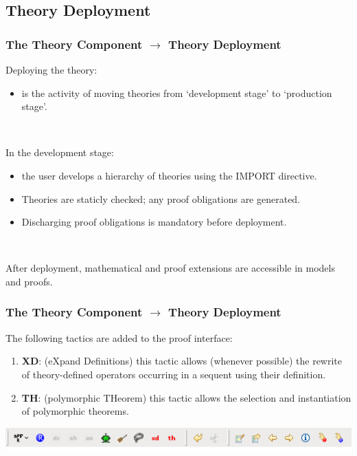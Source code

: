\documentclass{beamer}
\begin{document}
\subsection{Theory Deployment}
	\begin{frame}
		\frametitle{The Theory Component $\rightarrow$ Theory Deployment}
		Deploying the theory:
		\begin{itemize}
			\item is the activity of moving theories from `development stage' to `production stage'.
		\end{itemize}

~

		In the development stage:
		\begin{itemize}
			\item the user develops a hierarchy of theories using the IMPORT directive.
			\item Theories are staticly checked; any proof obligations are generated.
			\item Discharging proof obligations is mandatory before deployment.
		\end{itemize}

~

		After deployment, mathematical and proof extensions are accessible in models and proofs.
	\end{frame}
	\begin{frame}
		\frametitle{The Theory Component $\rightarrow$ Theory Deployment}
		The following tactics are added to the proof interface:
		\begin{enumerate}
			\item \textbf{XD}: (eXpand Definitions) this tactic allows (whenever possible) the rewrite of theory-defined operators occurring in a sequent using their definition.
			\item \textbf{TH}: (polymorphic THeorem) this tactic allows the selection and instantiation of polymorphic theorems.
		\end{enumerate}
		\begin{center}
			\includegraphics[scale=0.6]{Tactics}
		\end{center}
	\end{frame}
\end{document}
